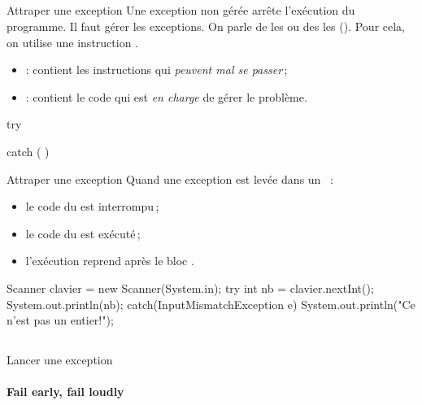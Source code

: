 \begin{hideedit}
\subsection{}
\begin{frame}[fragile]{Attraper une exception}
  Une exception non gérée arrête l'exécution du programme.
  \pause Il faut gérer les exceptions. On parle de les 
  ou des les  (\textit{}). Pour cela, on
  utilise une instruction .

  \begin{itemize}
    \item {} : contient les instructions qui \emph{peuvent mal se
      passer}\,;
    \item {} : contient le code qui est \emph{en charge} de gérer
      le problème.
  \end{itemize}

  \begin{grammaire}
    try  

    catch (  ) 
  \end{grammaire}
\end{frame}

\begin{frame}[fragile]{Attraper une exception}
  Quand une exception est levée dans un ~:
  \begin{itemize}
    \item le code du  est interrompu\,;
    \item le code du  est exécuté\,;
    \item l'exécution reprend après le bloc .
  \end{itemize}
  \begin{java}
Scanner clavier = new Scanner(System.in);
try {
    int nb = clavier.nextInt();
    System.out.println(nb);
}
catch(InputMismatchException e) {
    System.out.println("Ce n'est pas un entier!");
}
  \end{java}
\end{frame}

\subsection{}
\begin{frame}[fragile]{Lancer une exception}
  \framesubtitle{Fail early, fail loudly}


\end{frame}
\end{hideedit}
